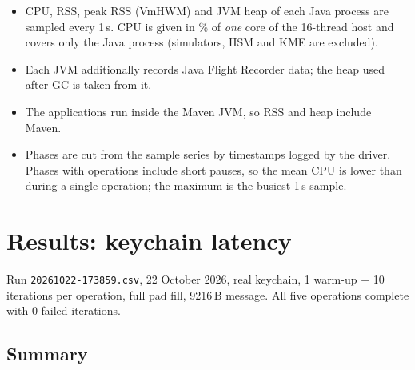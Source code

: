 \documentclass[11pt,a4paper]{report}
\begin{document}
\begin{itemize}
\item CPU, RSS, peak RSS (VmHWM) and JVM heap of each Java process are sampled every 1\,s. CPU is given in \% of \emph{one} core of the 16-thread host and covers only the Java process (simulators, HSM and KME are excluded).
\item Each JVM additionally records Java Flight Recorder data; the heap used after GC is taken from it.
\item The applications run inside the Maven JVM, so RSS and heap include Maven.
\item Phases are cut from the sample series by timestamps logged by the driver. Phases with operations include short pauses, so the mean CPU is lower than during a single operation; the maximum is the busiest 1\,s sample.
\end{itemize}

\chapter{Results: keychain latency}

Run \texttt{20261022-173859.csv}, 22 October 2026, real keychain, 1 warm-up + 10 iterations per operation, full pad fill, 9216\,B message. All five operations complete with 0 failed iterations.

\section{Summary}

\begin{table}[htbp]
\centering\small
{}
\caption{Keychain operation latency, real keychain (warm-up excluded, sample stddev). Source: summary block of \texttt{20261022-173859.csv}, converted from ms; CV computed from it.}
\label{tab:summary}
\end{table}
\end{document}
